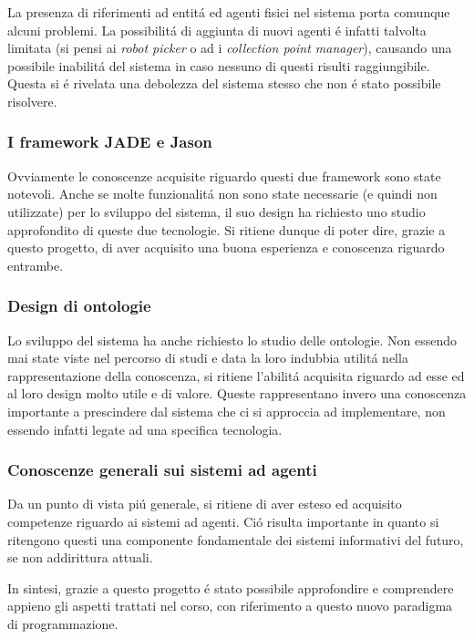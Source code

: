 La presenza di riferimenti ad entit\'a ed agenti fisici nel sistema porta comunque alcuni problemi. La possibilit\'a di aggiunta di nuovi agenti \'e infatti talvolta limitata (si pensi ai \textit{robot picker} o ad i \textit{collection point manager}), causando una possibile inabilit\'a del sistema in caso nessuno di questi risulti raggiungibile. Questa si \'e rivelata una debolezza del sistema stesso che non \'e stato possibile risolvere.

\subsubsection{I framework JADE e Jason}
Ovviamente le conoscenze acquisite riguardo questi due framework sono state notevoli. Anche se molte funzionalit\'a non sono state necessarie (e quindi non utilizzate) per lo sviluppo del sistema, il suo design ha richiesto uno studio approfondito di queste due tecnologie. Si ritiene dunque di poter dire, grazie a questo progetto, di aver acquisito una buona esperienza e conoscenza riguardo entrambe. 

\subsubsection{Design di ontologie}
Lo sviluppo del sistema ha anche richiesto lo studio delle ontologie. Non essendo mai state viste nel percorso di studi e data la loro indubbia utilit\'a nella rappresentazione della conoscenza, si ritiene l'abilit\'a acquisita riguardo ad esse ed al loro design molto utile e di valore. Queste rappresentano invero una conoscenza importante a prescindere dal sistema che ci si approccia ad implementare, non essendo infatti legate ad una specifica tecnologia.

\subsubsection{Conoscenze generali sui sistemi ad agenti}
Da un punto di vista pi\'u generale, si ritiene di aver esteso ed acquisito competenze riguardo ai sistemi ad agenti. Ci\'o risulta importante in quanto si ritengono questi una componente fondamentale dei sistemi informativi del futuro, se non addirittura attuali.

In sintesi, grazie a questo progetto \'e stato possibile approfondire e comprendere appieno gli aspetti trattati nel corso, con riferimento a questo nuovo paradigma
di programmazione.


